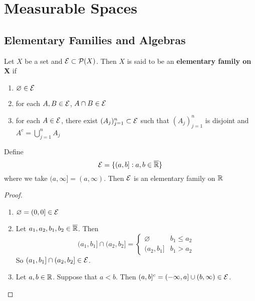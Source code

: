 \documentclass{book}
\begin{document}
	
	
	
	
	
	
	
	
	
	
	
	
	
	
	
	
	
	
	
	
	
	
	
	
	
	
	
	
	
	
	
	
	
	
	
	
	\newpage
	
	\chapter{Measurable Spaces}
	
	
	\section{Elementary Families and Algebras}
	
	\begin{defn}  
		Let $X$ be a set and $\mathcal{E} \subset \mathcal{P}(X)$. Then $X$ is said to be an \textbf{elementary family on X} if 
		\begin{enumerate}
			\item $\varnothing \in \mathcal{E}$
			\item for each $A, B \in \mathcal{E}$, $A \cap B \in \mathcal{E}$
			\item for each $A \in \mathcal{E}$, there exist $(A_j)_{j=1}^n \subset \mathcal{E}$ such that  $(A_j)_{j=1}^n $ is disjoint and $A^c = \bigcup\limits_{j=1}^n A_j$
		\end{enumerate}
	\end{defn}
	
	\begin{ex}  
		Define $$\mathcal{E} = \{(a,b]: a,b \in \overline{\mathbb{R}}\}$$ where we take $(a, \infty] = (a, \infty)$. Then $\mathcal{E}$ is an elementary family on $\mathbb{R}$
	\end{ex}
	
	\begin{proof}\
		\begin{enumerate}
			\item $\varnothing = (0,0] \in \mathcal{E}$
			\item Let $a_1, a_2, b_1, b_2 \in \overline{\mathbb{R}}$. Then 
			\[
			(a_1, b_1] \cap  (a_2, b_2] =
			\begin{cases}
				\varnothing  & b_1 \leq a_2 \\
				(a_2, b_1] & b_1 > a_2 
			\end{cases} 
			\]
			So $(a_1, b_1] \cap  (a_2, b_2] \in \mathcal{E}$.
			\item Let $a, b \in \mathbb{R}$. Suppose that $a < b$. Then $(a,b]^c = (-\infty, a] \cup (b, \infty) \in \mathcal{E}$. 
		\end{enumerate}
	\end{proof}
	
\end{document}
